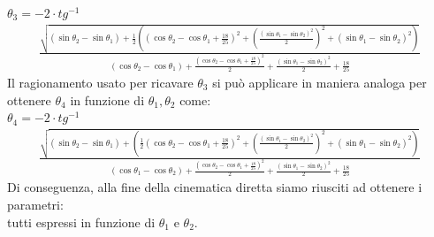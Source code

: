 \\$\theta_3 =-2\cdot tg^{-1}$
\begin{equation*}
    \begin{aligned}
   \frac{\sqrt{ (\sin\theta_2 - \sin\theta_1) + \frac{1}{2}((\cos\theta_2 - \cos\theta_1 + \frac{18}{25})^2+(\frac{(\sin\theta_1-\sin\theta_2)^2}{2})^2+(\sin\theta_1-\sin\theta_2)^2)}}{(\cos\theta_2-\cos\theta_1)+\frac{(\cos\theta_2-\cos\theta_1+\frac{18}{25})^2}{2}+\frac{(\sin\theta_1-\sin\theta_2)^2}{2}+\frac{18}{25}}
    \end{aligned}
\end{equation*}
Il ragionamento usato per ricavare $\theta_3$ si può applicare in maniera analoga per ottenere $\theta_4$ in funzione di $\theta_1, \theta_2$ come:
\\$\theta_4 = -2\cdot tg^{-1}$
\begin{equation*}
    \begin{aligned}
\frac{\sqrt{(\sin\theta_2-\sin\theta_1)+(\frac{1}{2}(\cos\theta_2-\cos\theta_1+\frac{18}{25})^2+(\frac{(\sin\theta_1-\sin\theta_2)^2}{2})^2+(\sin\theta_1-\sin\theta_2)^2)}}
    {(\cos\theta_1 -\cos\theta_2)+\frac{(\cos\theta_2-\cos\theta_1+\frac{18}{25})^2}{2}+\frac{(\sin\theta_1-\sin\theta_2)^2}{2}+\frac{18}{25}}
    \end{aligned}
\end{equation*}
Di conseguenza, alla fine della cinematica diretta siamo riusciti ad ottenere i parametri:
\begin{equation*}
	[x,y, E1, E2, \theta_3, \theta_4]
\end{equation*}
tutti espressi in funzione di $\theta_1$ e $\theta_2$.
